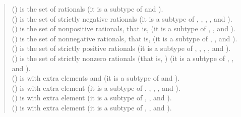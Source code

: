 \begin{description}
\begin{quote}
\begin{tabbing}
 () is the set of rationals
(it is a subtype of  and ).
\\
 () is the set of strictly negative rationals
(it is a subtype of , , , , and ).
\\
 () is the set of nonpositive rationals, that is, 
(it is a subtype of , , and ).
\\
 () is the set of nonnegative rationals, that is, 
(it is a subtype of , , and ).
\\
 () is the set of strictly positive rationals
(it is a subtype of , , , , and ).
\\
 () is the set of strictly nonzero rationals (that is, )
(it is a subtype of , , and ).
\\
 () is  with extra elements \EXP{+\infty} and \EXP{-\infty}
(it is a subtype of  and ).
\\
 () is  with extra element \EXP{-\infty}
(it is a subtype of , , , , and ).
\\
 () is  with extra element \EXP{-\infty}
(it is a subtype of , , and ).
\\
 () is  with extra element \EXP{+\infty}
(it is a subtype of , , and ).
\\

\end{tabbing}
\end{quote}
\end{description}
